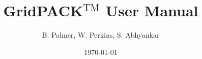 \documentclass[12pt]{report}
\begin{document}
\title{GridPACK$\mathrm{{}^{TM}}$ User Manual}
\author{B. Palmer, W. Perkins, S. Abhyankar}
\date{\today}
\maketitle





\hypertarget{topDoc}{\tableofcontents}
\eject














































































\end{document}
